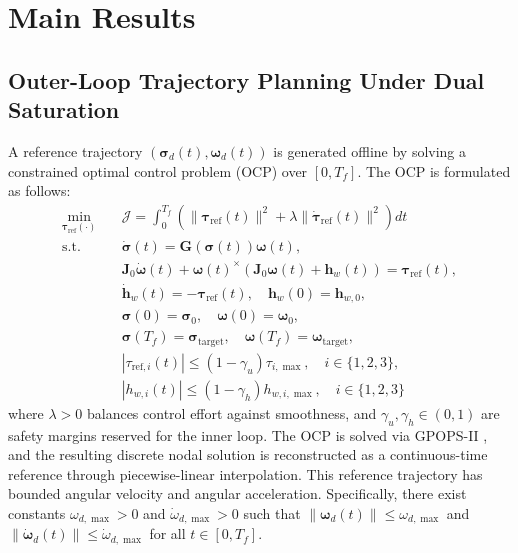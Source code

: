 \documentclass[journal]{new-aiaa}
\begin{document}
\section{Main Results}
\label{section:MAINRES}

\subsection{Outer-Loop Trajectory Planning Under Dual Saturation}
\label{sec:outer}

A reference trajectory $(\boldsymbol{\sigma}_d(t),\boldsymbol{\omega}_d(t))$ is generated offline by solving a constrained optimal control problem (OCP) over $[0,T_f]$. The OCP is formulated as follows:
\begin{equation}
\begin{aligned}
\min_{\boldsymbol{\tau}_{\mathrm{ref}}(\cdot)} \quad &
\mathcal{J} = \int_0^{T_f} \left( \|\boldsymbol{\tau}_{\mathrm{ref}}(t)\|^2
+ \lambda \|\dot{\boldsymbol{\tau}}_{\mathrm{ref}}(t)\|^2 \right) dt \\[2pt]
\mathrm{s.t.}\quad
& \dot{\boldsymbol{\sigma}}(t) = \boldsymbol{G}(\boldsymbol{\sigma}(t)) \boldsymbol{\omega}(t), \\
& \boldsymbol{J}_0 \dot{\boldsymbol{\omega}}(t) + \boldsymbol{\omega}(t)^{\times}\!\left(\boldsymbol{J}_0 \boldsymbol{\omega}(t) + \boldsymbol{h}_w(t)\right) = \boldsymbol{\tau}_{\mathrm{ref}}(t), \\
& \dot{\boldsymbol{h}}_w(t) = -\boldsymbol{\tau}_{\mathrm{ref}}(t), \quad \boldsymbol{h}_w(0) = \boldsymbol{h}_{w,0}, \\[2pt]
& \boldsymbol{\sigma}(0) = \boldsymbol{\sigma}_0, \quad \boldsymbol{\omega}(0) = \boldsymbol{\omega}_0, \\[2pt]
& \boldsymbol{\sigma}(T_f) = \boldsymbol{\sigma}_{\mathrm{target}}, \quad \boldsymbol{\omega}(T_f) = \boldsymbol{\omega}_{\mathrm{target}}, \\[2pt]
& |{\tau}_{\mathrm{ref},i}(t)| \le (1-\gamma_u) \tau_{i,\max}, \quad i \in \{1,2,3\}, \\
& |h_{w,i}(t)| \le (1-\gamma_h) h_{w,i,\max}, \quad i \in \{1,2,3\}
\end{aligned}
\label{eq:OCP_slack}
\end{equation}
where $\lambda>0$ balances control effort against smoothness,
and $\gamma_u,\gamma_h\in(0,1)$ are safety margins reserved for the inner loop.
The OCP is solved via GPOPS-II \cite{patterson_gpops-ii_2014}, and the resulting discrete nodal solution is reconstructed as a continuous-time reference through piecewise-linear interpolation.
This reference trajectory has bounded angular velocity and angular acceleration. Specifically, there exist constants $\omega_{d,\max}>0$ and $\dot{\omega}_{d,\max}>0$ such that
$\|\boldsymbol{\omega}_d(t)\| \le \omega_{d,\max}$ and
$\|\dot{\boldsymbol{\omega}}_d(t)\| \le \dot{\omega}_{d,\max}$ for all $t\in[0,T_f]$.
\end{document}
